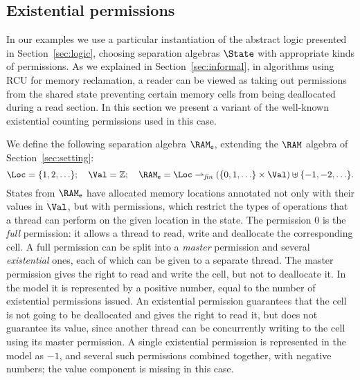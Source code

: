 \subsection{Existential permissions\label{sec:exist}} 

In our examples we use a particular instantiation of the abstract logic
presented in Section~\ref{sec:logic}, choosing separation algebras $\State$ with
appropriate kinds of permissions. As we explained in Section~\ref{sec:informal},
in algorithms using RCU for memory reclamation, a reader can be viewed as taking
out permissions from the shared state preventing certain memory cells from being
deallocated during a read section. In this section we present a variant of the
well-known existential counting permissions used in this case.

We define the following separation algebra $\RAM_{\sf e}$, extending the $\RAM$
algebra of Section~\ref{sec:setting}:
$$
\Loc = \{1, 2, \ldots\};
\quad 
\Val = \mathbb{Z};
\quad
\RAM_{\sf e} = \Loc \rightharpoonup_{\it fin} (\{0, 1, \ldots\} \times \Val) \uplus
\{-1, -2, \ldots\}.
$$
States from $\RAM_{\sf e}$ have allocated memory locations annotated not only
with their values in $\Val$, but with permissions, which restrict the types of
operations that a thread can perform on the given location in the state. The
permission $0$ is the {\em full} permission: it allows a thread to read, write
and deallocate the corresponding cell. A full permission can be split into a
{\em master} permission and several {\em existential} ones, each of which can be
given to a separate thread. The master permission gives the right to read and
write the cell, but not to deallocate it. In the model it is represented by a
positive number, equal to the number of existential permissions issued.  An
existential permission guarantees that the cell is not going to be deallocated
and gives the right to read it, but does not guarantee its value, since another
thread can be concurrently writing to the cell using its master permission. A
single existential permission is represented in the model as $-1$, and several
such permissions combined together, with negative numbers; the value component is
missing in this case.

